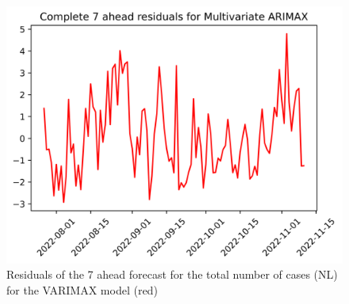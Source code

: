 \begin{figure}
\begin{minipage}{.32\textwidth}
\end{minipage}
\begin{minipage}{.32\textwidth}
  \centering
  \includegraphics[width=\linewidth]{pics/7_ah/7_ahead_errors_Multivariate ARIMAX.png}
  \caption{Residuals of the 7 ahead forecast for the total number of cases (NL) for the VARIMAX model (red)}
  \label{fig:tot_cases_error_7_VARIMAX}
\end{minipage}
\end{figure}
